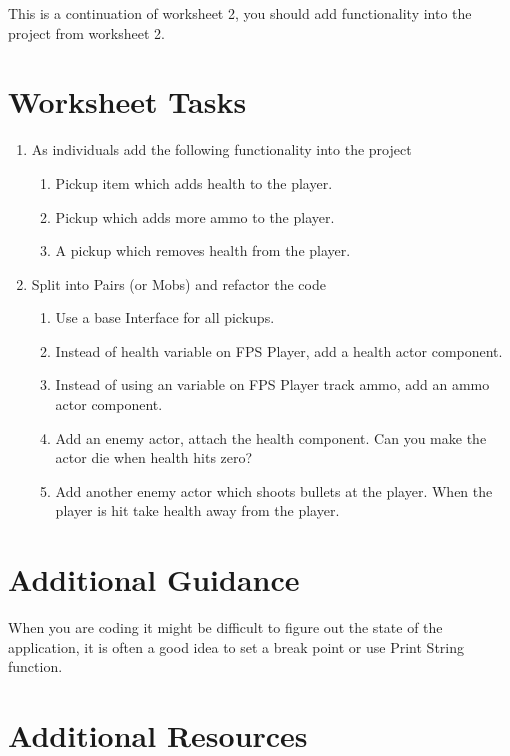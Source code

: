 \documentclass{../../../fal_assignment}
\begin{document}
This is a continuation of worksheet 2, you should add functionality into the project from worksheet 2.

\section*{Worksheet Tasks}

\begin{enumerate}
	\item As individuals add the following functionality into the project
  	\begin{enumerate}[label=(\Alph*)]
      \item Pickup item which adds health to the player.
      \item Pickup which adds more ammo to the player.
      \item A pickup which removes health from the player.
    \end{enumerate}
\item Split into Pairs (or Mobs) and refactor the code
		\begin{enumerate}[label=(\Alph*)]
		\item Use a base Interface for all pickups.
    \item Instead of health variable on FPS Player, add a health actor component.
    \item Instead of using an variable on FPS Player track ammo, add an ammo actor component.
    \item Add an enemy actor, attach the health component. Can you make the actor die when health hits zero?
    \item Add another enemy actor which shoots bullets at the player. When the player is hit take health away from the player.
		\end{enumerate}
\end{enumerate}

\section*{Additional Guidance}
When you are coding it might be difficult to figure out the state of the application, it is often a good idea to set a break point or use Print String function.


\section*{Additional Resources}
\end{document}

